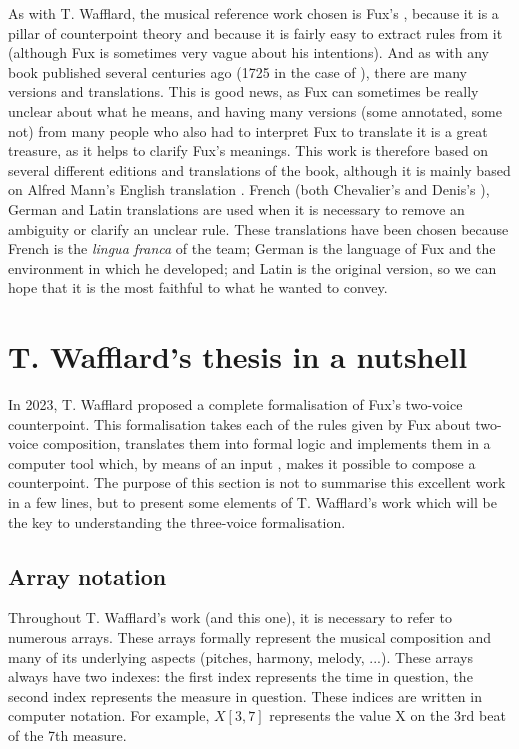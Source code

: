 As with T. Wafflard, the musical reference work chosen is Fux's \gap, because it is a pillar of counterpoint theory and because it is fairly easy to extract rules from it (although Fux is sometimes very vague about his intentions). And as with any book published several centuries ago (1725 in the case of \gap), there are many versions and translations. This is good news, as Fux can sometimes be really unclear about what he means, and having many versions (some annotated, some not) from many people who also had to interpret Fux to translate it is a great treasure, as it helps to clarify Fux's meanings. This work is therefore based on several different editions and translations of the book, although it is mainly based on Alfred Mann's English translation \cite{GaPEng}. French (both Chevalier's \cite{GaPFrChevalier} and Denis's \cite{GaPFrDenis}), German \cite{GaPDe} and Latin \cite{GapLa} translations are used when it is necessary to remove an ambiguity or clarify an unclear rule. These translations have been chosen because French is the \textit{lingua franca} of the team; German is the language of Fux and the environment in which he developed; and Latin is the original version, so we can hope that it is the most faithful to what he wanted to convey.



\section{T. Wafflard's thesis in a nutshell}\label{section:thomas-in-a-nutshell}

In 2023, T. Wafflard proposed a complete formalisation of Fux's two-voice counterpoint. This formalisation takes each of the rules given by Fux about two-voice composition, translates them into formal logic and implements them in a computer tool which, by means of an input \cf, makes it possible to compose a counterpoint. The purpose of this section is not to summarise this excellent work in a few lines, but to present some elements of T. Wafflard's work which will be the key to understanding the three-voice formalisation.

\subsection{Array notation}
Throughout T. Wafflard's work (and this one), it is necessary to refer to numerous arrays. These arrays formally represent the musical composition and many of its underlying aspects (pitches, harmony, melody, ...). These arrays always have two indexes: the first index represents the time in question, the second index represents the measure in question. These indices are written in computer notation. For example, $X[3, 7]$ represents the value X on the 3rd beat of the 7th measure.

